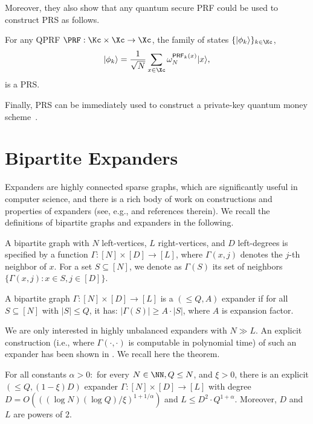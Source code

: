 Moreover, they also show that any quantum secure PRF could be used to construct PRS as follows.
\begin{theorem}
For any QPRF $\PRF:\Kc \times \Xc \to \Xc$, the family of states $\{ |\phi_k \rangle \}_{k \in \Kc}$,
$$
|\phi_k\rangle = \frac{1}{\sqrt{N}}\sum_{x\in\Xc} \omega_N^{\mathsf{PRF}_k(x)}|x\rangle,
$$
is a PRS.
\end{theorem}

Finally, PRS can be immediately used to construct a private-key quantum money scheme~\cite{C:JiLiuSon18}.


\section{Bipartite Expanders}
Expanders are highly connected sparse graphs, which are significantly useful in computer science, and there is a rich body of work on constructions and properties of expanders (see, e.g., \cite{HooLinWig06} and references therein). We recall the definitions of bipartite graphs and expanders in the following.

\begin{definition}\label{def:bipartite}
	A bipartite graph with $N$ left-vertices, $L$ right-vertices, and $D$ left-degrees is specified by a function $\Gamma: [N] \times [D]  \rightarrow [L]$, where $\Gamma(x,j)$ denotes the $j$-th neighbor of $x$. For a set $S \subseteq [N]$, we denote as $\Gamma(S)$ its set of neighbors $\{\Gamma(x,j):x\in S, j\in [D]\}$.
\end{definition}

\begin{definition}\label{def:expander}
	A bipartite graph $\Gamma: [N] \times [D]  \rightarrow [L]$ is a $(\leq Q, A)$ expander if for all $S\subseteq [N]$ with $|S|\leq Q$, it has: $|\Gamma(S)| \geq A \cdot |S|$, where $A$ is expansion factor.
\end{definition}
%
We are only interested in highly unbalanced expanders with $N \gg L$. An explicit construction (i.e., where $\Gamma(\cdot,\cdot)$ is computable in polynomial time) of such an expander has been shown in \cite{GurUmaVad09}. We recall here the theorem.

\begin{theorem}\label{the:expander}
	For all constants $\alpha > 0:$ for every $N\in \NN, Q\leq N$, and $\xi > 0$, there is an explicit $(\leq Q, (1-\xi)D)$ expander $\Gamma: [N]\times [D]\rightarrow[L]$ with degree $D=O\left(((\log N)(\log Q)/\xi)^{1+1/\alpha} \right)$ and $L\leq D^2\cdot Q^{1+\alpha}$. Moreover, $D$ and $L$ are powers of $2$.
\end{theorem}

